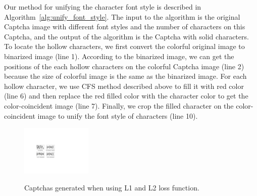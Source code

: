 Our method for unifying the character font style is described in Algorithm~\ref{alg:unify_font_style}.
The input to the algorithm is the original Captcha image with different font styles and the number of characters on this Captcha, and the output of the algorithm is the Captcha with solid characters. To locate the hollow characters, we first convert the colorful original image to binarized image (line 1). According to the binarized image, we can get the positions of the each hollow characters on the colorful Captcha image (line 2) because the size of colorful image is the same as the binarized image. For each hollow character, we use CFS method described above to fill it with red color (line 6) and then replace the red filled color with the character color to get the color-coincident image (line 7). Finally, we crop the filled character on the color-coincident image to unify the font style of characters (line 10).

\begin{figure}
  \centering
  \includegraphics[width=0.3\textwidth]{fig/loss_anlysis/captcha_generated.pdf} \\
  \caption{Captchas generated when using L1 and L2 loss function.}
  \label{fig: L1_L2}
\end{figure}

